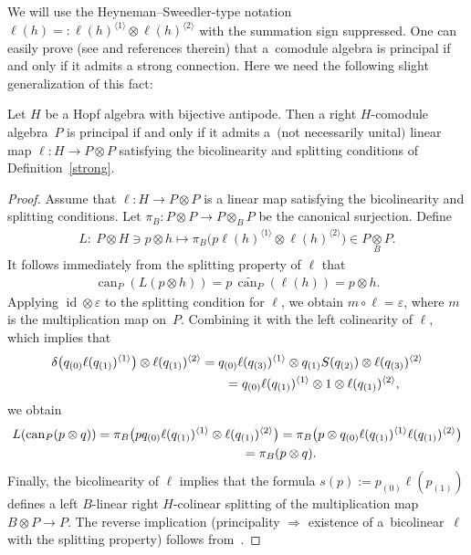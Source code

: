 We will use the  Heyneman--Sweedler-type notation
$
\ell(h)=:\ell(h)^{\langle 1 \rangle}\otimes
 \ell(h)^{\langle 2 \rangle}
$
 with the summation sign suppressed.
 One can easily prove (see \cite[p.~599]{hkmz11} and references therein) that
a~comodule algebra is principal if and only if it admits a strong
connection.
Here we need the following slight generalization of this fact:
\begin{Lemma}\label{general}
Let $H$ be a Hopf algebra with bijective antipode. Then a right $H$-comodule algebra~$P$ is principal if and
only if it admits a~$($not necessarily unital$)$ linear map $\ell \colon H \rightarrow  P \otimes  P$ satisfying the
bicolinearity and splitting conditions of Definition~{\rm \ref{strong}}.
\end{Lemma}

\begin{proof}
Assume that $\ell \colon H \rightarrow  P \otimes  P$ is a linear map satisfying the bicolinearity and splitting
conditions.
Let $\pi_B\colon P\otimes P\to P\otimes_BP$ be the canonical surjection. Def\/ine
\begin{gather*}
L\colon \ P\otimes H\ni p\otimes h\longmapsto \pi_B\big(p \ell(h)^{\langle 1\rangle}\otimes\ell(h)^{\langle 2\rangle}\big)\in P\underset{B}{\otimes}P.
\end{gather*}
It follows immediately from the  splitting property of $\ell$ that
\begin{gather*}
\operatorname{can}_P(L(p\otimes h))= p \, \widetilde{\operatorname{can}_P}(\ell(h))=p\otimes h.
\end{gather*}
Applying $\operatorname{id}\otimes\varepsilon$ to the splitting condition for $\ell$, we obtain $m\circ\ell=\varepsilon$, where $m$ is
the multiplication map on~$P$.
Combining it with the left colinearity of $\ell$, which implies that
\begin{gather*}
\delta\big(q_{(0)}\ell(q_{(1)})^{\langle 1\rangle}\big)\otimes\ell(q_{(1)})^{\langle 2\rangle}
=q_{(0)}\ell(q_{(3)})^{\langle 1\rangle}\otimes q_{(1)}S(q_{(2)})\otimes\ell(q_{(3)})^{\langle 2\rangle}\\
\hphantom{\delta\big(q_{(0)}\ell(q_{(1)})^{\langle 1\rangle}\big)\otimes\ell(q_{(1)})^{\langle 2\rangle}}{}
=q_{(0)}\ell(q_{(1)})^{\langle 1\rangle}\otimes 1\otimes\ell(q_{(1)})^{\langle 2\rangle},
\end{gather*}
we obtain
\begin{gather*}
L(\operatorname{can}_P(p\otimes q)) = \pi_B \big(pq_{(0)} \ell(q_{(1)})^{\langle 1\rangle}
 \otimes  \ell(q_{(1)})^{\langle 2\rangle}\big)
 = \pi_B \big(p \otimes q_{(0)} \ell(q_{(1)})^{\langle 1\rangle} \ell(q_{(1)})^{\langle 2\rangle}\big)
 \\
\hphantom{L(\operatorname{can}_P(p\otimes q))}{}
=  \pi_B(p\otimes q).
\end{gather*}
Finally, the bicolinearity of $\ell$ implies that the formula $s(p):= p_{(0)}\ell(p_{(1)})$ def\/ines a left $B$-linear
right $H$-colinear splitting
of the multiplication map $B\otimes P\to P$. The reverse implication (principality $\Rightarrow$ existence of a~bicolinear~$\ell$ with the splitting property)
follows from~\cite[Lemma~2.2]{bh04}.
\end{proof}


